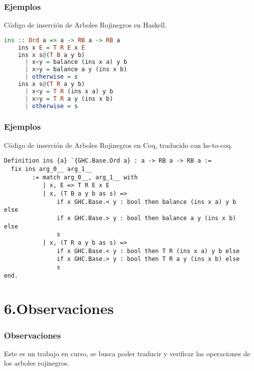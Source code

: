 \documentclass[xcolor=dvipsnames,table,handout]{beamer}
\begin{document}
\begin{frame}[fragile]
  \frametitle{Ejemplos}
  Código de inserción de Arboles Rojinegros en Haskell.
       \begin{lstlisting}[language=haskell]
    ins :: Ord a => a -> RB a -> RB a
    ins x E = T R E x E
    ins x s@(T B a y b)
      | x<y = balance (ins x a) y b
      | x>y = balance a y (ins x b)
      | otherwise = s
    ins x s@(T R a y b)
      | x<y = T R (ins x a) y b
      | x>y = T R a y (ins x b)
      | otherwise = s
       \end{lstlisting}
\end{frame}

\begin{frame}[fragile]
  \frametitle{Ejemplos}
  Código de inserción de Arboles Rojinegros en Coq, traducido con hs-to-coq.
       \begin{lstlisting}[language=Coq]
Definition ins {a} `{GHC.Base.Ord a} : a -> RB a -> RB a :=
  fix ins arg_0__ arg_1__
        := match arg_0__, arg_1__ with
           | x, E => T R E x E
           | x, (T B a y b as s) =>
               if x GHC.Base.< y : bool then balance (ins x a) y b else
               if x GHC.Base.> y : bool then balance a y (ins x b) else
               s
           | x, (T R a y b as s) =>
               if x GHC.Base.< y : bool then T R (ins x a) y b else
               if x GHC.Base.> y : bool then T R a y (ins x b) else
               s
end.
       \end{lstlisting}
\end{frame}

\section{6.Observaciones}
\begin{frame}
  \frametitle{Observaciones}
  Este es un trabajo en curso, se busca poder traducir y verificar las operaciones de los arboles rojinegros.
\end{frame}
\end{document}
